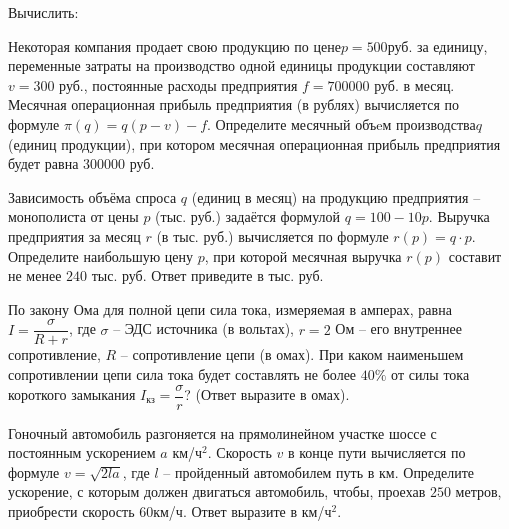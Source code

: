%
%
\begin{class}[number=1]
	\begin{listofex}
		\item Вычислить:
		\begin{enumcols}[itemcolumns=3]
			\item {}
			\item {}
			\item {}
			\item {}
			\item {}
			\item {}
			\item {}
		\end{enumcols}
		\item Некоторая компания продает свою продукцию по цене\(  p=500  \)руб. за единицу, переменные затраты на производство одной единицы продукции составляют  \( v=300 \) руб., постоянные расходы предприятия \( f=700000 \) руб. в месяц. Месячная операционная прибыль предприятия (в рублях) вычисляется по формуле  \( \pi(q)=q(p-v)-f \). Определите месячный объeм производства\(  q \) (единиц продукции), при котором месячная операционная прибыль предприятия будет равна \( 300000 \) руб.
		\item Зависимость объёма спроса \( q \) (единиц в месяц) на продукцию предприятия – монополиста от цены \( p \) (тыс. руб.) задаётся формулой \( q=100-10p \). Выручка предприятия за месяц \( r \) (в тыс. руб.) вычисляется по формуле \( r(p)=q\cdot p \). Определите наибольшую цену \( p \), при которой месячная выручка \( r(p) \) составит не менее \( 240 \) тыс. руб. Ответ приведите в тыс. руб.
		\item По закону Ома для полной цепи сила тока, измеряемая в амперах, равна \( I=\dfrac{\sigma}{R+r} \), где \(\sigma\) – ЭДС источника (в вольтах), \(r=2\) Ом – его внутреннее сопротивление, \(R\) – сопротивление цепи (в омах). При каком наименьшем сопротивлении цепи сила тока будет составлять не более \(40\% \) от силы тока короткого замыкания \( I_{кз} =\dfrac{\sigma}{r}\)? (Ответ выразите в омах).
		\item Гоночный автомобиль разгоняется на прямолинейном участке шоссе с постоянным ускорением \( a \) км/ч\( ^2 \). Скорость \( v \)  в конце пути вычисляется по формуле \( v=\sqrt{2la} \), где \( l \) – пройденный автомобилем путь в км. Определите ускорение, с которым должен двигаться автомобиль, чтобы, проехав \( 250 \) метров, приобрести скорость \( 60 \)км/ч. Ответ выразите в км/ч\( ^2 \).

\end{listofex}
\end{class}
